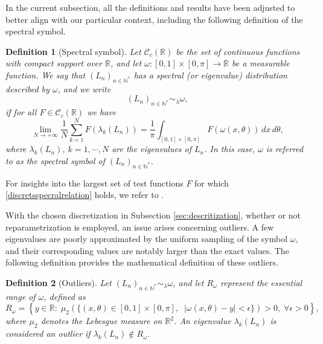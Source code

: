 \documentclass[11pt]{article}
\newtheorem{definition}{Definition}[section]
\begin{document}
In the current subsection, all the definitions and results have been adjusted to better align with our particular context, including the following definition of the spectral symbol.  
\begin{definition}[Spectral symbol]\label{defspectralsymbol}  
Let $\mathcal{C}_c(\mathbb{R})$ be the set of continuous functions with compact support over $\mathbb{R}$, and let $\omega :[0,1]\times[0,\pi] \longrightarrow \mathbb{R}$ be a measurable function. We say that $(L_{n})_{n\in\mathbb{N}^{*}}$ has a spectral (or eigenvalue) distribution described by $\omega$, and we write  
$$  
(L_{n})_{n\in\mathbb{N}^{*}}\sim_{\lambda} \omega,  
$$  
if for all $F \in \mathcal{C}_c(\mathbb{R})$ we have  
\begin{equation}\label{discretsspecralrelation}  
    \lim_{N\longrightarrow + \infty}\dfrac{1}{N}\displaystyle\sum_{k=1}^N F(\lambda_k(L_n))=\dfrac{1}{\pi}\displaystyle\int_{[0,1]\times[0,\pi]} F( \omega(x,\theta)) \,dx\,d\theta,  
\end{equation}  
where $\lambda_k(L_n)$, $k=1, \cdots, N$ are the eigenvalues of $L_n$. In this case, $\omega$ is referred to as the spectral symbol of $(L_{n})_{n\in\mathbb{N}^*}$.  
\end{definition}  
For insights into the largest set of test functions $F$ for which \eqref{discretsspecralrelation} holds, we refer to \cite{bianchi2024asymptotic}.  

With the chosen discretization in Subsection \ref{sec:descritization}, whether or not reparametrization is employed, an issue arises concerning outliers. A few eigenvalues are poorly approximated by the uniform sampling of the symbol $\omega$, and their corresponding values are notably larger than the exact values. The following definition  provides  the mathematical definition of these outliers.  
\begin{definition}[Outliers]  
Let $(L_{n})_{n\in\mathbb{N}^*}\sim_{\lambda} \omega$, and let $R_\omega$ represent the essential range of $\omega$, defined as   
\begin{equation}\label{eq:essential-range}  
R_{\omega} = \left\{ y \in \mathbb{R}:\; \mu_{2}\left(\{(x,\theta)\in [0,1]\times[0,\pi],\;\; |\omega(x,\theta)-y|<\epsilon      \}\right)> 0, \; \forall \epsilon>0 \right\},  
\end{equation}  
where $\mu_{2}$ denotes the Lebesgue measure on $\mathbb{R}^{2}$. An eigenvalue $\lambda_k(L_n)$ is considered an outlier if $\lambda_k(L_n) \notin  R_{\omega}$.  
\end{definition}  
\end{document}
